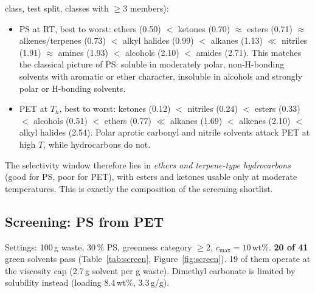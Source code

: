 \documentclass[11pt,a4paper]{article}
\newcommand{\wt}{wt\%}
\begin{document}
\begin{enumerate}
class, test split, classes with $\ge3$ members):
  \begin{itemize}
  \item PS at RT, best to worst: ethers (0.50) $<$ ketones (0.70) $\approx$ esters (0.71) $\approx$
  alkenes/terpenes (0.73) $<$ alkyl halides (0.99) $<$ alkanes (1.13) $\ll$ nitriles (1.91) $\approx$
  amines (1.93) $<$ alcohols (2.10) $<$ amides (2.71). This matches the classical picture of PS: soluble
  in moderately polar, non-H-bonding solvents with aromatic or ether character, insoluble in alcohols and
  strongly polar or H-bonding solvents.
  \item PET at $T_h$, best to worst: ketones (0.12) $<$ nitriles (0.24) $<$ esters (0.33) $<$ alcohols
  (0.51) $<$ ethers (0.77) $\ll$ alkanes (1.69) $<$ alkenes (2.10) $<$ alkyl halides (2.54). Polar
  aprotic carbonyl and nitrile solvents attack PET at high $T$, while hydrocarbons do not.
  \end{itemize}
  The selectivity window therefore lies in \emph{ethers and terpene-type hydrocarbons} (good for PS, poor
  for PET), with esters and ketones usable only at moderate temperatures. This is exactly the composition
  of the screening shortlist.
\end{enumerate}

\subsection{Screening: PS from PET}
Settings: 100\,g waste, 30\,\% PS, greenness category $\ge 2$, $c_{\max}=10$\,\wt.
\textbf{20 of 41} green solvents pass (Table~\ref{tab:screen}, Figure~\ref{fig:screen}). 19 of them
operate at the viscosity cap (2.7\,g solvent per g waste). Dimethyl carbonate is limited by solubility
instead (loading 8.4\,\wt, 3.3\,g/g).
\end{document}
